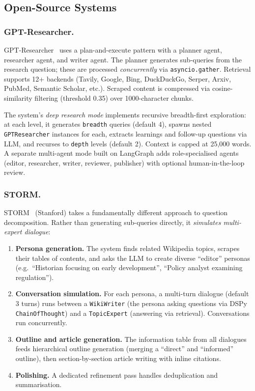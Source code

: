 \documentclass[11pt,a4paper]{article}
\begin{document}
\subsection{Open-Source Systems}

\subsubsection{GPT-Researcher.}
GPT-Researcher~\citep{gptresearcher2024} uses a plan-and-execute
pattern with a planner agent, researcher agent, and writer agent. The
planner generates sub-queries from the research question; these are
processed \emph{concurrently} via \texttt{asyncio.gather}. Retrieval
supports 12+ backends (Tavily, Google, Bing, DuckDuckGo, Serper, Arxiv,
PubMed, Semantic Scholar, etc.). Scraped content is compressed via
cosine-similarity filtering (threshold 0.35) over 1000-character chunks.

The system's \emph{deep research mode} implements recursive
breadth-first exploration: at each level, it generates \texttt{breadth}
queries (default 4), spawns nested \texttt{GPTResearcher} instances for
each, extracts learnings and follow-up questions via LLM, and recurses
to \texttt{depth} levels (default 2). Context is capped at 25,000 words.
A separate multi-agent mode built on LangGraph adds role-specialised
agents (editor, researcher, writer, reviewer, publisher) with optional
human-in-the-loop review.

\subsubsection{STORM.}
STORM~\citep{storm2024} (Stanford) takes a fundamentally different
approach to question decomposition. Rather than generating sub-queries
directly, it \emph{simulates multi-expert dialogue}:

\begin{enumerate}[nosep]
  \item \textbf{Persona generation.} The system finds related Wikipedia
    topics, scrapes their tables of contents, and asks the LLM to create
    diverse ``editor'' personas (e.g.\ ``Historian focusing on early
    development'', ``Policy analyst examining regulation'').
  \item \textbf{Conversation simulation.} For each persona, a
    multi-turn dialogue (default 3 turns) runs between a
    \texttt{WikiWriter} (the persona asking questions via DSPy
    \texttt{ChainOfThought}) and a \texttt{TopicExpert} (answering via
    retrieval). Conversations run concurrently.
  \item \textbf{Outline and article generation.} The information table
    from all dialogues feeds hierarchical outline generation (merging a
    ``direct'' and ``informed'' outline), then section-by-section
    article writing with inline citations.
  \item \textbf{Polishing.} A dedicated refinement pass handles
    deduplication and summarisation.
\end{enumerate}
\end{document}
